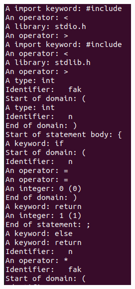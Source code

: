 \begin{figure}
    \includegraphics[width=\linewidth]{bilder/flex.png}
    \label{fig:flex}
\end{figure}


